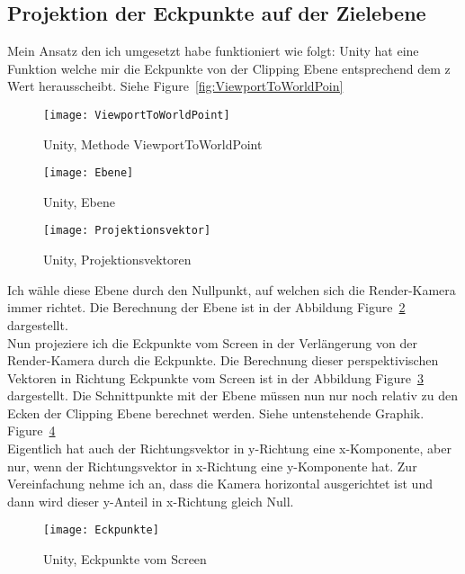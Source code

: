 \subsection{Projektion der Eckpunkte auf der Zielebene}
Mein Ansatz den ich umgesetzt habe funktioniert wie folgt: 
Unity hat eine Funktion welche mir die Eckpunkte von der Clipping Ebene entsprechend dem z Wert herausscheibt. Siehe Figure~\ref{fig:ViewportToWorldPoin}

\begin{figure}[H]
	\texttt{[image: ViewportToWorldPoint]}
	\caption{Unity, Methode ViewportToWorldPoint}
	\label{fig:ViewportToWorldPoint}
\end{figure}

\begin{figure}[H]
	\texttt{[image: Ebene]}
	\caption{Unity, Ebene}
	\label{fig:Ebene}
\end{figure}

\begin{figure}[H]
	\texttt{[image: Projektionsvektor]}
	\caption{Unity, Projektionsvektoren}
	\label{fig:Projektionsvektoren}
\end{figure}


Ich wähle diese Ebene durch den Nullpunkt, auf welchen sich die Render-Kamera immer richtet. Die Berechnung der Ebene ist in der Abbildung Figure~\ref{fig:Ebene} dargestellt.\\
Nun projeziere ich die Eckpunkte vom Screen in der Verlängerung von der Render-Kamera durch die Eckpunkte. Die Berechnung dieser perspektivischen Vektoren in Richtung Eckpunkte vom Screen ist in der Abbildung  Figure~\ref{fig:Projektionsvektoren} dargestellt. Die Schnittpunkte mit der Ebene müssen nun nur noch relativ zu den Ecken der Clipping Ebene berechnet werden. Siehe untenstehende Graphik. Figure~\ref{fig:Eckpunkte} \\ Eigentlich hat auch der Richtungsvektor in y-Richtung eine x-Komponente, aber nur, wenn der Richtungsvektor in x-Richtung eine y-Komponente hat. Zur Vereinfachung nehme ich an, dass die Kamera horizontal ausgerichtet ist und dann wird dieser y-Anteil in x-Richtung gleich Null.

\begin{figure}[H]
	\texttt{[image: Eckpunkte]}
	\caption{Unity, Eckpunkte vom Screen}
	\label{fig:Eckpunkte}
\end{figure}







